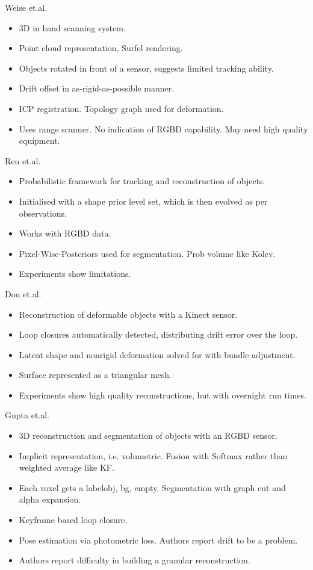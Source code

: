 Weise et.al. \cite{Weise2009}
\begin{itemize}
	\item 3D in hand scanning system.
	\item Point cloud representation, Surfel rendering. \cite{Pfister2000}
	\item Objects rotated in front of a sensor, suggests limited tracking ability.
	\item Drift offset in as-rigid-as-possible manner. %
	\item ICP registration. Topology graph used for deformation.
	\item Uses range scanner. No indication of RGBD capability. May need high quality equipment.
\end{itemize}

Ren et.al. \cite{Ren2013}
\begin{itemize}
	\item Probabilistic framework for tracking and reconstruction of objects.
	\item Initialised with a shape prior level set, which is then evolved as per observations.
	\item Works with RGBD data.
	\item Pixel-Wise-Posteriors used for segmentation. Prob volume like Kolev. \cite{Bibby2008}
	\item Experiments show limitations.
\end{itemize}

Dou et.al. \cite{Dou2015}
\begin{itemize}
	\item Reconstruction of deformable objects with a Kinect sensor.
	\item Loop closures automatically detected, distributing drift error over the loop.
	\item Latent shape and nonrigid deformation solved for with bundle adjustment.
	\item Surface represented as a triangular mesh.
	\item Experiments show high quality reconstructions, but with overnight run times.
\end{itemize}

Gupta et.al. \cite{Gupta2016}
\begin{itemize}
	\item 3D reconstruction and segmentation of objects with an RGBD sensor.
	\item Implicit representation, i.e. volumetric. Fusion with Softmax rather than weighted average like KF.
	\item Each voxel gets a label{obj, bg, empty}. Segmentation with graph cut and alpha expansion.
	\item Keyframe based loop closure.
	\item Pose estimation via photometric loss. Authors report drift to be a problem.
	\item Authors report difficulty in building a granular reconstruction.
\end{itemize}

